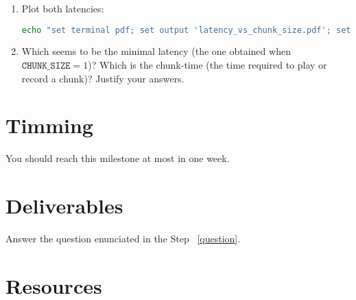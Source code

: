 \begin{enumerate}
\item Plot both latencies:

  \begin{lstlisting}[language=Bash, showstringspaces=false, upquote=true]
    echo "set terminal pdf; set output 'latency_vs_chunk_size.pdf'; set xlabel 'CHUNK\_SIZE (frames)'; set ylabel 'Latency (seconds)'; set key left; plot 'latency_vs_chunk_size.txt' using 1:2 title 'Real' with linespoints, 'latency_vs_chunk_size.txt' using 1:3 title 'Minimal' with linespoints" | gnuplot
  \end{lstlisting}
  
\item Which seems to be the minimal latency (the one obtained
  when $\mathtt{CHUNK\_SIZE}=1$)? Which is the chunk-time (the time
  required to play or record a chunk)? Justify your
  answers. \label{question}

\end{enumerate}

\section{Timming}

You should reach this milestone at most in one week.

\section{Deliverables}

Answer the question enunciated in the Step ~\ref{question}.

\section{Resources}


